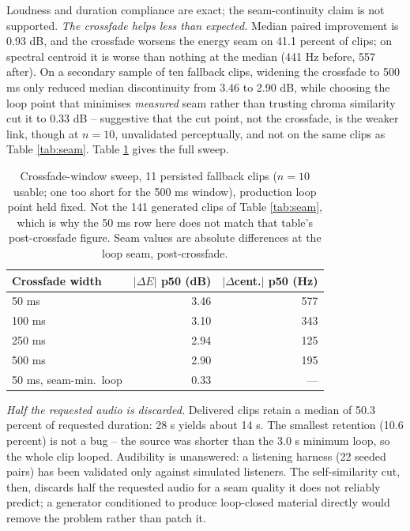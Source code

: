 \documentclass[conference]{IEEEtran}
\let\IEEEoriginalcaption\caption
\renewcommand{\caption}[1]{\IEEEoriginalcaption{\footnotesize #1}}
\begin{document}
Loudness and duration compliance are exact; the seam-continuity claim is
not supported. \emph{The crossfade helps less than expected.} Median
paired improvement is 0.93 dB, and the crossfade worsens the energy seam
on 41.1 percent of clips; on spectral centroid it is worse than nothing
at the median (441 Hz before, 557 after). On a secondary sample of ten
fallback clips, widening the crossfade to 500 ms only reduced median
discontinuity from 3.46 to 2.90 dB, while choosing the loop point that
minimises \emph{measured} seam rather than trusting chroma similarity cut
it to 0.33 dB -- suggestive that the cut point, not the crossfade, is the
weaker link, though at $n=10$, unvalidated perceptually, and not on the
same clips as Table \ref{tab:seam}. Table \ref{tab:crossfade} gives the
full sweep.

\begin{table}[t]
\caption{Crossfade-window sweep, 11 persisted fallback clips ($n=10$
usable; one too short for the 500 ms window), production loop point
held fixed. Not the 141 generated clips of Table \ref{tab:seam}, which
is why the 50 ms row here does not match that table's post-crossfade
figure. Seam values are absolute differences at the loop seam,
post-crossfade.}
\label{tab:crossfade}
\begin{center}
\scriptsize
\begin{tabular}{lrr}
\toprule
\textbf{Crossfade width} & \textbf{$|\Delta E|$ p50 (dB)} & \textbf{$|\Delta$cent.$|$ p50 (Hz)} \\
\midrule
50 ms & 3.46 & 577 \\
100 ms & 3.10 & 343 \\
250 ms & 2.94 & 125 \\
500 ms & 2.90 & 195 \\
50 ms, seam-min.\ loop & 0.33 & --- \\
\bottomrule
\end{tabular}
\end{center}
\end{table}

\emph{Half the requested audio is discarded.} Delivered clips retain a
median of 50.3 percent of requested duration: 28 s yields about 14 s. The
smallest retention (10.6 percent) is not a bug -- the source was shorter
than the 3.0 s minimum loop, so the whole clip looped. Audibility is
unanswered: a listening harness (22 seeded pairs) has been validated only
against simulated listeners. The self-similarity cut, then, discards half
the requested audio for a seam quality it does not reliably predict; a
generator conditioned to produce loop-closed material directly would
remove the problem rather than patch it.
\end{document}
